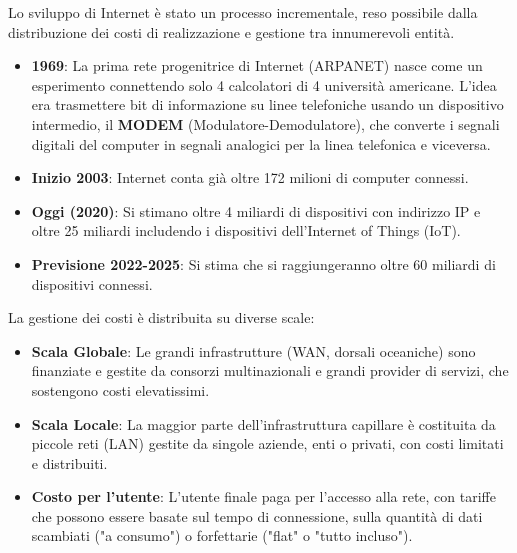 Lo sviluppo di Internet è stato un processo incrementale, reso possibile dalla distribuzione dei costi di realizzazione e gestione tra innumerevoli entità.
\begin{itemize}
    \item \textbf{1969}: La prima rete progenitrice di Internet (ARPANET) nasce come un esperimento connettendo solo 4 calcolatori di 4 università americane. L'idea era trasmettere bit di informazione su linee telefoniche usando un dispositivo intermedio, il \textbf{MODEM} (Modulatore-Demodulatore), che converte i segnali digitali del computer in segnali analogici per la linea telefonica e viceversa.
    \item \textbf{Inizio 2003}: Internet conta già oltre 172 milioni di computer connessi.
    \item \textbf{Oggi (2020)}: Si stimano oltre 4 miliardi di dispositivi con indirizzo IP e oltre 25 miliardi includendo i dispositivi dell'Internet of Things (IoT).
    \item \textbf{Previsione 2022-2025}: Si stima che si raggiungeranno oltre 60 miliardi di dispositivi connessi.
\end{itemize}


La gestione dei costi è distribuita su diverse scale:
\begin{itemize}
    \item \textbf{Scala Globale}: Le grandi infrastrutture (WAN, dorsali oceaniche) sono finanziate e gestite da consorzi multinazionali e grandi provider di servizi, che sostengono costi elevatissimi.
    \item \textbf{Scala Locale}: La maggior parte dell'infrastruttura capillare è costituita da piccole reti (LAN) gestite da singole aziende, enti o privati, con costi limitati e distribuiti.
    \item \textbf{Costo per l'utente}: L'utente finale paga per l'accesso alla rete, con tariffe che possono essere basate sul tempo di connessione, sulla quantità di dati scambiati ("a consumo") o forfettarie ("flat" o "tutto incluso").
\end{itemize}


